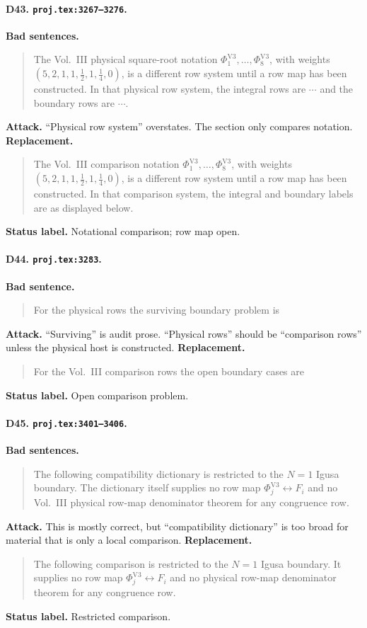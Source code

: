 \paragraph{D43. \texttt{proj.tex:3267--3276}.}
\textbf{Bad sentences.}
\begin{quote}\small
The Vol.~III physical square-root notation
\(\Phi^{\mathrm{V3}}_1,\ldots,\Phi^{\mathrm{V3}}_8\), with weights
\((5,2,1,1,\tfrac12,1,\tfrac14,0)\), is a different row system until a
row map has been constructed.  In that physical row system, the integral
rows are \(\cdots\) and the boundary rows are \(\cdots\).
\end{quote}
\textbf{Attack.}
``Physical row system'' overstates.  The section only compares notation.
\textbf{Replacement.}
\begin{quote}\small
The Vol.~III comparison notation
\(\Phi^{\mathrm{V3}}_1,\ldots,\Phi^{\mathrm{V3}}_8\), with weights
\((5,2,1,1,\tfrac12,1,\tfrac14,0)\), is a different row system until a
row map has been constructed.  In that comparison system, the integral
and boundary labels are as displayed below.
\end{quote}
\textbf{Status label.} Notational comparison; row map open.

\paragraph{D44. \texttt{proj.tex:3283}.}
\textbf{Bad sentence.}
\begin{quote}\small
For the physical rows the surviving boundary problem is
\end{quote}
\textbf{Attack.}
``Surviving'' is audit prose.  ``Physical rows'' should be ``comparison
rows'' unless the physical host is constructed.
\textbf{Replacement.}
\begin{quote}\small
For the Vol.~III comparison rows the open boundary cases are
\end{quote}
\textbf{Status label.} Open comparison problem.

\paragraph{D45. \texttt{proj.tex:3401--3406}.}
\textbf{Bad sentences.}
\begin{quote}\small
The following compatibility dictionary is restricted to the \(N=1\) Igusa
boundary.  The dictionary itself supplies no row map
\(\Phi^{\mathrm{V3}}_j\longleftrightarrow F_i\)
and no Vol.~III physical row-map denominator theorem for any congruence
row.
\end{quote}
\textbf{Attack.}
This is mostly correct, but ``compatibility dictionary'' is too broad for
material that is only a local comparison.
\textbf{Replacement.}
\begin{quote}\small
The following comparison is restricted to the \(N=1\) Igusa boundary.  It
supplies no row map
\(\Phi^{\mathrm{V3}}_j\longleftrightarrow F_i\)
and no physical row-map denominator theorem for any congruence row.
\end{quote}
\textbf{Status label.} Restricted comparison.

